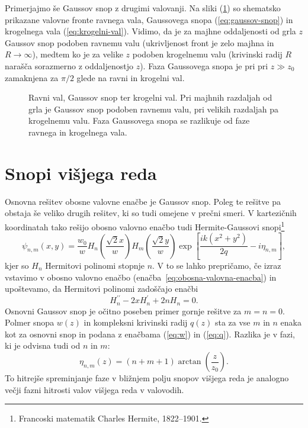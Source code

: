 Primerjajmo še Gaussov snop z drugimi valovanji. Na sliki (\ref{fig:ravni-Gaussov-krogelni-val}) 
so shematsko prikazane valovne fronte ravnega vala, Gaussovega snopa (\ref{eq:gaussov-snop}) in krogelnega
vala (\ref{eq:krogelni-val}). Vidimo, da je za majhne oddaljenosti od grla $z$ Gaussov
snop podoben ravnemu valu (ukrivljenost front je zelo majhna in $R \to \infty$), 
medtem ko je za velike $z$ podoben krogelnemu valu (krivinski radij $R$ narašča sorazmerno z oddaljenostjo $z$). 
Faza Gaussovega snopa je pri pri $z\gg z_{0}$ zamaknjena za $\pi/2$ glede na ravni in 
krogelni val. 

\begin{figure}[h]
\centering
\def\svgwidth{100truemm} 

\caption{Ravni val, Gaussov snop ter
krogelni val. Pri majhnih razdaljah od grla je Gaussov snop podoben
ravnemu valu, pri velikih razdaljah pa krogelnemu valu. Faza Gaussovega snopa
se razlikuje od faze ravnega in krogelnega vala.}
\label{fig:ravni-Gaussov-krogelni-val}
\end{figure}

\section{Snopi višjega reda}

Osnovna rešitev obosne valovne enačbe je Gaussov snop. Poleg te rešitve pa obstaja še veliko 
drugih rešitev, ki so tudi omejene v prečni smeri. V kartezičnih koordinatah tako rešijo obosno valovno enačbo
tudi Hermite-Gaussovi snopi\footnote{Francoski matematik Charles Hermite, 1822--1901.}
\begin{equation}
\psi_{n,m}(x,y)=\frac{w_{0}}{w}H_{n}\left(\frac{\sqrt{2}x}{w}\right)H_{m}\left(\frac{\sqrt{2}y}{w}\right)
\exp\left[\frac{ik(x^{2}+y^{2})}{2q}-i\eta_{n,m}\right],
\label{eq:Gauss-Hermitevi}
\end{equation}
kjer so $H_{n}$ Hermitovi polinomi stopnje $n$. V to se lahko
prepričamo, če izraz vstavimo v obosno valovno enačbo (enačba~\ref{eq:obosna-valovna-enacba}) in upoštevamo, 
da Hermitovi polinomi zadoščajo enačbi 
\begin{equation}
H_{n}^{\prime\prime}-2xH_{n}^{\prime}+2nH_{n}=0.
\end{equation}
Osnovni Gaussov snop je očitno poseben primer gornje rešitve za $m=n=0$.
Polmer snopa $w(z)$ in kompleksni krivinski radij $q(z)$ sta za
vse $m$ in $n$ enaka kot za osnovni snop in podana z enačbama (\ref{eq:w})
in (\ref{eq:q}). Razlika je v fazi, ki je odvisna tudi od $n$ in $m$: 
\begin{equation}
\eta_{n,m}\left(z\right)=(n+m+1)\arctan\left(\frac{z}{z_{0}}\right).
\end{equation}
To hitrejše spreminjanje faze v bližnjem polju snopov višjega reda
je analogno večji fazni hitrosti valov višjega reda v valovodih.

